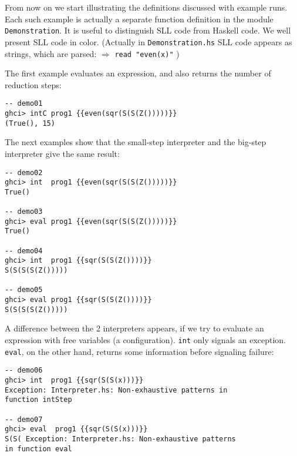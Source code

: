 

From now on we start illustrating the definitions discussed with example runs.
Each such example is actually a separate function definition in the module \texttt{Demonstration}.
It is useful to distinguish SLL code from Haskell code.
We well present SLL code in color.
(Actually in \texttt{Demonstration.hs} SLL code appears as strings, which are parsed:
\texttt{{\color{brown}{even(x)}}} $\Rightarrow$ \texttt{read "even(x)"} )

The first example evaluates an expression, and also returns the number of reduction steps:
\begin{lstlisting}[style=demo]
-- demo01
ghci> intC prog1 {{even(sqr(S(S(Z()))))}}
(True(), 15)
\end{lstlisting}

The next examples show that the small-step interpreter and the big-step interpreter give the same result:
\begin{lstlisting}[style=demo]
-- demo02
ghci> int  prog1 {{even(sqr(S(S(Z()))))}}
True()

-- demo03
ghci> eval prog1 {{even(sqr(S(S(Z()))))}}
True()

-- demo04
ghci> int  prog1 {{sqr(S(S(Z())))}}
S(S(S(S(Z()))))

-- demo05
ghci> eval prog1 {{sqr(S(S(Z())))}}
S(S(S(S(Z()))))
\end{lstlisting}

A difference between the 2 interpreters appears, if we try to evaluate an expression
with free variables (a configuration).
\texttt{int} only signals an exception. 
\texttt{eval}, on the other hand, returns some information before signaling failure:
\begin{lstlisting}[style=demo]
-- demo06
ghci> int  prog1 {{sqr(S(S(x)))}}
Exception: Interpreter.hs: Non-exhaustive patterns in 
function intStep

-- demo07
ghci> eval  prog1 {{sqr(S(S(x)))}}
S(S( Exception: Interpreter.hs: Non-exhaustive patterns 
in function eval
\end{lstlisting}

